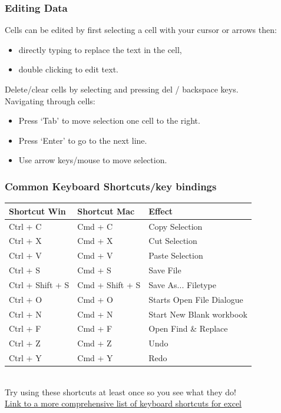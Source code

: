\documentclass[12pt]{beamer}
\begin{document}
	\begin{frame}
		\frametitle{Editing Data}
		Cells can be edited by first selecting a cell with your cursor or arrows then:
		\begin{itemize}
			\item directly typing to replace the text in the cell,
			\item double clicking to edit text. 
		\end{itemize}
		Delete/clear cells by selecting and pressing del / backspace keys. \\
		Navigating through cells: \begin{itemize}
			\item Press  `Tab' to move selection one cell to the right.
			\item Press `Enter' to go to the next line.
			\item Use arrow keys/mouse to move selection.
		\end{itemize}
	\end{frame}
	\begin{frame}
		\frametitle{Common Keyboard Shortcuts/key bindings}
			\begin{tabular}{|l|l|l|}
				\hline
				Shortcut Win & Shortcut Mac & Effect \\
				\hline
				Ctrl + C & Cmd + C & Copy Selection \\
				Ctrl + X & Cmd + X & Cut Selection \\
				Ctrl + V & Cmd + V & Paste Selection\\
				Ctrl + S & Cmd + S & Save File \\
				Ctrl + Shift + S & Cmd + Shift + S & Save As... Filetype \\ 
				Ctrl + O & Cmd + O & Starts Open File Dialogue \\
				Ctrl + N & Cmd + N & Start New Blank workbook \\
				Ctrl + F & Cmd + F & Open Find \& Replace\\
				Ctrl + Z & Cmd + Z & Undo \\
				Ctrl + Y & Cmd + Y & Redo \\
				\hline
			\end{tabular}\\
		\bigskip
		Try using these shortcuts at least once so you see what they do!\\
		\textcolor{blue}{\href{https://support.microsoft.com/en-us/office/keyboard-shortcuts-in-excel-1798d9d5-842a-42b8-9c99-9b7213f0040f}{Link to a more comprehensive list of keyboard shortcuts for excel}}
	\end{frame}
\end{document}
